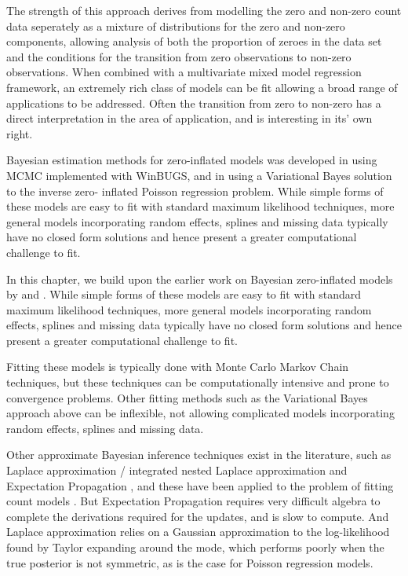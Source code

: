 The strength of this approach derives from modelling the zero and non-zero count data seperately as a mixture
of distributions for the zero and non-zero components, allowing analysis of both the proportion of zeroes in
the data set and the conditions for the transition from zero observations to non-zero observations. When
combined with a multivariate mixed model regression framework, an extremely rich class of models can be fit
allowing a broad range of applications to be addressed. Often the transition from zero to non-zero has a
direct interpretation in the area of application, and is interesting in its' own right.

Bayesian estimation methods for zero-inflated models was developed in \cite{Ghosh2006} using MCMC implemented
with WinBUGS, and in \cite{Vatsa2014} using a Variational Bayes solution to the inverse zero- inflated
Poisson regression problem. While simple forms of these models are easy to fit with standard  maximum
likelihood techniques, more general models incorporating random effects, splines and missing data  typically
have no closed form solutions and hence present a greater computational challenge to fit.

In this chapter, we build upon the earlier work on Bayesian zero-inflated models by \cite{Ghosh2006} and
\cite{Vatsa2014}. While simple forms of these models are easy to fit with standard maximum likelihood
techniques, more general models incorporating random effects, splines and missing data typically have no
closed form solutions and hence present a greater computational challenge to fit.

Fitting these models is typically done with Monte Carlo Markov Chain techniques, but these techniques can be
computationally intensive and prone to convergence problems.  Other fitting methods such as the Variational
Bayes approach above can be inflexible, not allowing complicated models incorporating random effects, splines
and missing data.

Other approximate Bayesian inference techniques exist in the literature, such as
Laplace approximation \cite{Tierney1986}/ integrated nested Laplace approximation \cite{Rue2009} and Expectation Propagation \cite{Minka2013}, and these have been applied to the problem of fitting
count models
\cite{Barber2016}
\cite{KimWand2017}.
But Expectation Propagation requires very difficult algebra to complete the derivations required for the
updates, and is slow to compute. And Laplace approximation relies on a Gaussian approximation to the
log-likelihood found by Taylor expanding around the mode, which performs poorly when the true posterior is
not symmetric, as is the case for Poisson regression models.

